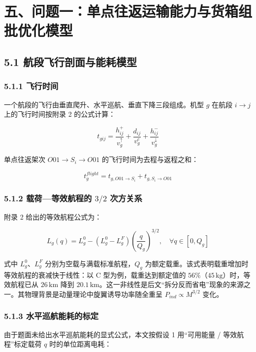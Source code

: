 \documentclass[withoutpreface,bwprint]{format}
\begin{document}
\clearpage
\section{五、问题一：单点往返运输能力与货箱组批优化模型}

\subsection{5.1 航段飞行剖面与能耗模型}

\subsubsection{5.1.1 飞行时间}
一个航段的飞行由垂直爬升、水平巡航、垂直下降三段组成。机型 $g$ 在航段 $i \to j$ 上的飞行时间按附录 2 的公式计算：

\begin{equation}
t_{gij} = \frac{h_{ij}^+}{v_g^\uparrow} + \frac{d_{ij}}{v_g^c} + \frac{h_{ij}^-}{v_g^\downarrow}
\end{equation}

单点往返架次 $O01 \to S_i \to O01$ 的飞行时间为去程与返程之和：

\begin{equation}
t_g^{flight} = t_{g, O01 \to S_i} + t_{g, S_i \to O01}
\end{equation}

\subsubsection{\texorpdfstring{5.1.2 载荷—等效航程的 $3/2$ 次方关系}{5.1.2 载荷—等效航程的 3/2 次方关系}}
附录 2 给出的等效航程公式为：

\begin{equation}
L_g(q) = L_g^0 - (L_g^0 - L_g^F) \left(\frac{q}{Q_g}\right)^{3/2}, \quad \forall q \in [0, Q_g]
\label{eq:range_32}
\end{equation}

式中 $L_g^0$、$L_g^F$ 分别为空载与满载标准航程，$Q_g$ 为额定载重。该式表明载重增加时等效航程的衰减快于线性：以 C 型为例，载重达到额定值的 $56\%$（$45\,\text{kg}$）时，等效航程已从 $26\,\text{km}$ 降到 $20.1\,\text{km}$。这一非线性是后文“拆分反而省电”现象的来源之一。其物理背景是动量理论中旋翼诱导功率随全重呈 $P_{ind}\propto M^{3/2}$ 变化\cite{leishman2006}。

\subsubsection{5.1.3 水平巡航能耗的标定}
由于题面未给出水平巡航能耗的显式公式，本文按假设 1 用“可用能量 / 等效航程”标定载荷 $q$ 时的单位距离电耗：
\end{document}

